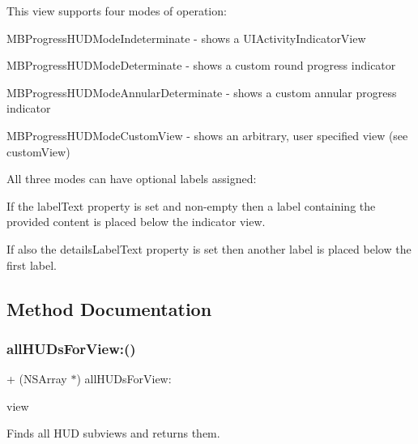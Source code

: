 This view supports four modes of operation\+:
\begin{DoxyItemize}
\item M\+B\+Progress\+H\+U\+D\+Mode\+Indeterminate -\/ shows a U\+I\+Activity\+Indicator\+View
\item M\+B\+Progress\+H\+U\+D\+Mode\+Determinate -\/ shows a custom round progress indicator
\item M\+B\+Progress\+H\+U\+D\+Mode\+Annular\+Determinate -\/ shows a custom annular progress indicator
\item M\+B\+Progress\+H\+U\+D\+Mode\+Custom\+View -\/ shows an arbitrary, user specified view (see {\ttfamily custom\+View})
\end{DoxyItemize}

All three modes can have optional labels assigned\+:
\begin{DoxyItemize}
\item If the label\+Text property is set and non-\/empty then a label containing the provided content is placed below the indicator view.
\item If also the details\+Label\+Text property is set then another label is placed below the first label. 
\end{DoxyItemize}

\subsection{Method Documentation}
\mbox{\label{interface_m_b_progress_h_u_d_aaa8882a53b5edfd617b4ba112c60811b}} 
\subsubsection{\texorpdfstring{all\+H\+U\+Ds\+For\+View\+:()}{allHUDsForView:()}\hspace{0.1cm}{\footnotesize\ttfamily [1/3]}}
{\footnotesize\ttfamily + (N\+S\+Array $\ast$) all\+H\+U\+Ds\+For\+View\+: \begin{DoxyParamCaption}\item[{(U\+I\+View $\ast$)}]{view }\end{DoxyParamCaption}}

Finds all H\+UD subviews and returns them.


